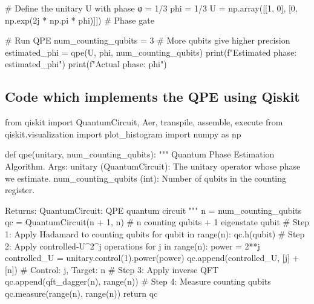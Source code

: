 \documentclass[%
oneside,                 %
final,                   %
10pt]{article}
\begin{document}
# Define the unitary U with phase φ = 1/3
phi = 1/3
U = np.array([[1, 0], [0, np.exp(2j * np.pi * phi)]])  # Phase gate

# Run QPE
num_counting_qubits = 3  # More qubits give higher precision
estimated_phi = qpe(U, phi, num_counting_qubits)
print(f"Estimated phase: {estimated_phi}")
print(f"Actual phase: {phi}")

\epycode


\subsection{Code which implements the QPE using Qiskit}


























































\bpycode
from qiskit import QuantumCircuit, Aer, transpile, assemble, execute
from qiskit.visualization import plot_histogram
import numpy as np

def qpe(unitary, num_counting_qubits):
   """
   Quantum Phase Estimation Algorithm.
   Args:
       unitary (QuantumCircuit): The unitary operator whose phase we estimate.
       num_counting_qubits (int): Number of qubits in the counting register.

   Returns:
       QuantumCircuit: QPE quantum circuit
   """
   n = num_counting_qubits
   qc = QuantumCircuit(n + 1, n)  # n counting qubits + 1 eigenstate qubit
   # Step 1: Apply Hadamard to counting qubits
   for qubit in range(n):
       qc.h(qubit)
   # Step 2: Apply controlled-U^2^j operations
   for j in range(n):
       power = 2**j
       controlled_U = unitary.control(1).power(power)
       qc.append(controlled_U, [j] + [n])  # Control: j, Target: n
   # Step 3: Apply inverse QFT
   qc.append(qft_dagger(n), range(n))
   # Step 4: Measure counting qubits
   qc.measure(range(n), range(n))
   return qc
\end{document}
